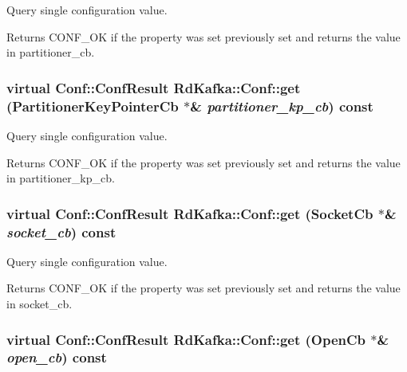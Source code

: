 Query single configuration value. \begin{DoxyReturn}{Returns}
CONF\_\-OK if the property was set previously set and returns the value in {\ttfamily partitioner\_\-cb}. 
\end{DoxyReturn}
\hypertarget{classRdKafka_1_1Conf_a8335a5c13d7241d3269cc356c95807c4}{
\subsubsection[{get}]{\setlength{\rightskip}{0pt plus 5cm}virtual {\bf Conf::ConfResult} RdKafka::Conf::get ({\bf PartitionerKeyPointerCb} $\ast$\& {\em partitioner\_\-kp\_\-cb}) const}}
\label{classRdKafka_1_1Conf_a8335a5c13d7241d3269cc356c95807c4}


Query single configuration value. \begin{DoxyReturn}{Returns}
CONF\_\-OK if the property was set previously set and returns the value in {\ttfamily partitioner\_\-kp\_\-cb}. 
\end{DoxyReturn}
\hypertarget{classRdKafka_1_1Conf_a4cdab91c91fba1ee380bf90ff716ffee}{
\subsubsection[{get}]{\setlength{\rightskip}{0pt plus 5cm}virtual {\bf Conf::ConfResult} RdKafka::Conf::get ({\bf SocketCb} $\ast$\& {\em socket\_\-cb}) const}}
\label{classRdKafka_1_1Conf_a4cdab91c91fba1ee380bf90ff716ffee}


Query single configuration value. \begin{DoxyReturn}{Returns}
CONF\_\-OK if the property was set previously set and returns the value in {\ttfamily socket\_\-cb}. 
\end{DoxyReturn}
\hypertarget{classRdKafka_1_1Conf_a0c4d5be151ad4e1da74af1e5ad8071fc}{
\subsubsection[{get}]{\setlength{\rightskip}{0pt plus 5cm}virtual {\bf Conf::ConfResult} RdKafka::Conf::get ({\bf OpenCb} $\ast$\& {\em open\_\-cb}) const}}
\label{classRdKafka_1_1Conf_a0c4d5be151ad4e1da74af1e5ad8071fc}


